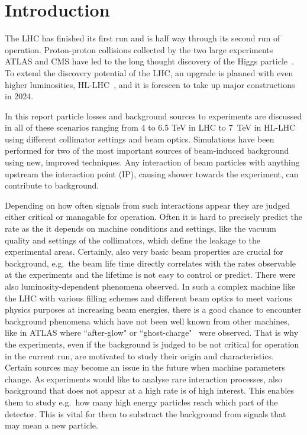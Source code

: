 \section{Introduction}


The LHC has finished its first run and is half way through its second run of operation. Proton-proton collisions collected by the two large experiments ATLAS and CMS have led to the long thought discovery of the Higgs particle~\cite{Aad20121,Chatrchyan201230}. To extend the discovery potential of the LHC, an upgrade is planned with even higher luminosities, HL-LHC~\cite{hl-lhc-prel-design}, and it is foreseen to take up major constructions in 2024.

In this report particle losses and background sources to experiments are discussed in all of these scenarios ranging from 4 to 6.5 TeV in LHC to 7~TeV in HL-LHC using different collimator settings and beam optics. Simulations have been performed for two of the most important sources of beam-induced background using new, improved techniques. Any interaction of beam particles with anything upstream the interaction point (IP), causing shower towards the experiment, can contribute to background.

Depending on how often signals from such interactions appear they are judged either critical or managable for operation. Often it is hard to precisely predict the rate as the it depends on machine conditions and settings, like the vacuum quality and settings of the collimators, which define the leakage to the experimental areas. Certainly, also very basic beam properties are crucial for background, e.g.~the beam life time directly correlates with the rates observable at the experiments and the lifetime is not easy to control or predict. There were also luminosity-dependent phenomena observed. In such a complex machine like the LHC with various filling schemes and different beam optics to meet various physics purposes at increasing beam energies, there is a good chance to encounter background phenomena which have not been well known from other machines, like in ATLAS where ``after-glow" or ``ghost-charge"~\cite{ATLAS_JINST_13} were observed. That is why the experiments, even if the background is judged to be not critical for operation in the current run, are motivated to study their origin and characteristics. Certain sources may become an issue in the future when machine parameters change. As experiments would like to analyse rare interaction processes, also background that does not appear at a high rate is of high interest. This enables them to study e.g.~how many high energy particles reach which part of the detector. This is vital for them to substract the background from signals that may mean a new particle. 

